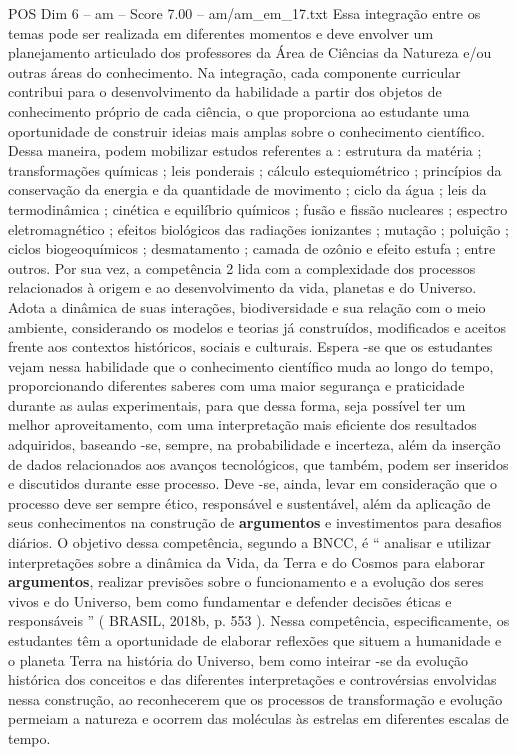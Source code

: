 \begin{textsample}{POS Dim 6 – am – Score 7.00 – am/am\_em\_17.txt}
Essa integração entre os temas pode ser realizada em diferentes momentos e deve envolver um planejamento articulado dos professores da Área de Ciências da Natureza e/ou outras áreas do conhecimento.
Na integração, cada componente curricular contribui para o desenvolvimento da habilidade a partir dos objetos de conhecimento próprio de cada ciência, o que proporciona ao estudante uma oportunidade de construir ideias mais amplas sobre o conhecimento científico.
Dessa maneira, podem mobilizar estudos referentes a : estrutura da matéria ; transformações químicas ; leis ponderais ; cálculo estequiométrico ; princípios da conservação da energia e da quantidade de movimento ; ciclo da água ; leis da termodinâmica ; cinética e equilíbrio químicos ; fusão e fissão nucleares ; espectro eletromagnético ; efeitos biológicos das radiações ionizantes ; mutação ; poluição ; ciclos biogeoquímicos ; desmatamento ; camada de ozônio e efeito estufa ; entre outros.
Por sua vez, a competência 2 lida com a complexidade dos processos relacionados à origem e ao desenvolvimento da vida, planetas e do Universo.
Adota a dinâmica de suas interações, biodiversidade e sua relação com o meio ambiente, considerando os modelos e teorias já construídos, modificados e aceitos frente aos contextos históricos, sociais e culturais.
Espera -se que os estudantes vejam nessa habilidade que o conhecimento científico muda ao longo do tempo, proporcionando diferentes saberes com uma maior segurança e praticidade durante as aulas experimentais, para que dessa forma, seja possível ter um melhor aproveitamento, com uma interpretação mais eficiente dos resultados adquiridos, baseando -se, sempre, na probabilidade e incerteza, além da inserção de dados relacionados aos avanços tecnológicos, que também, podem ser inseridos e discutidos durante esse processo.
Deve -se, ainda, levar em consideração que o processo deve ser sempre ético, responsável e sustentável, além da aplicação de seus conhecimentos na construção de \textbf{argumentos} e investimentos para desafios diários.
O objetivo dessa competência, segundo a BNCC, é “ analisar e utilizar interpretações sobre a dinâmica da Vida, da Terra e do Cosmos para elaborar \textbf{argumentos}, realizar previsões sobre o funcionamento e a evolução dos seres vivos e do Universo, bem como fundamentar e defender decisões éticas e responsáveis ” ( BRASIL, 2018b, p. 553 ).
Nessa competência, especificamente, os estudantes têm a oportunidade de elaborar reflexões que situem a humanidade e o planeta Terra na história do Universo, bem como inteirar -se da evolução histórica dos conceitos e das diferentes interpretações e controvérsias envolvidas nessa construção, ao reconhecerem que os processos de transformação e evolução permeiam a natureza e ocorrem das moléculas às estrelas em diferentes escalas de tempo.

\end{textsample}
